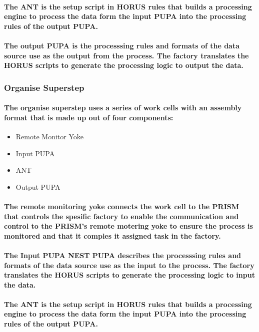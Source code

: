 \documentclass{acm_proc_article-sp}
\begin{document}
\paragraph{The ANT is the setup script in HORUS rules that builds a processing engine to process the data form the input PUPA into the processing rules of the output PUPA. }
\paragraph{The output PUPA is the processsing rules and formats of the data source use as the output from the process. The factory translates the HORUS scripts to generate the processing logic to output the data.}
\subsubsection{Organise Superstep}
\paragraph{The organise superstep uses a series of work cells with an assembly format that is made up out of four components:}
\begin{itemize}
\item{Remote Monitor Yoke}
\item{Input PUPA}
\item{ANT}
\item{Output PUPA}
\end{itemize}
\paragraph{The remote monitoring yoke connects the work cell to the PRISM that controls the spesific factory to enable the communication and control to the PRISM's remote motering yoke to ensure the process is monitored and that it comples it assigned task in the factory.}
\paragraph{The Input PUPA NEST PUPA describes the processsing rules and formats of the data source use as the input to the process. The factory translates the HORUS scripts to generate the processing logic to input the data.}
\paragraph{The ANT is the setup script in HORUS rules that builds a processing engine to process the data form the input PUPA into the processing rules of the output PUPA. }
\end{document}
